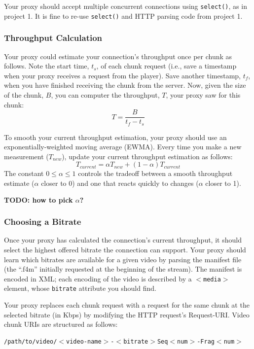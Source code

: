 \documentclass{article}
\begin{document}
Your proxy should accept multiple concurrent connections using
\texttt{select()}, as in project 1. It is fine to re-use \texttt{select()} and
HTTP parsing code from project 1.

\subsubsection{Throughput Calculation}
Your proxy could estimate your connection's throughput once per chunk as
follows. Note the start time, $t_s$, of each chunk request (i.e., save a
timestamp when your proxy receives a request from the player). Save another
timestamp, $t_f$, when you have finished receiving the chunk from the server.
Now, given the size of the chunk, $B$, you can computer the throughput, $T$,
your proxy saw for this chunk:
\[
	T = \frac{B}{t_f - t_s}
\]


To smooth your current throughput estimation, your proxy should use an
exponentially-weighted moving average (EWMA). Every time you make a new
measurement ($T_{new}$), update your current throughput estimation as follows:
\[
	T_{current} = \alpha T_{new}  +  (1 - \alpha)T_{current}
\]
The constant $0 \leq \alpha \leq 1$ controls the tradeoff between a smooth
throughput estimate ($\alpha$ closer to 0) and one that reacts quickly to
changes ($\alpha$ closer to 1).

\textbf{TODO: how to pick $\alpha$?}



\subsubsection{Choosing a Bitrate}

Once your proxy has calculated the connection's current throughput, it should
select the highest offered bitrate the connection can support. Your proxy
should learn which bitrates are available for a given video by parsing the
manifest file (the ``.f4m'' initially requested at the beginning of the
stream). The manifest is encoded in XML; each encoding of the video is
described by a \texttt{$<$media$>$} element, whose \texttt{bitrate} attribute
you should find.

Your proxy replaces each chunk request with a request for the same chunk at the
selected bitrate (in Kbps) by modifying the HTTP request's Request-URI. Video
chunk URIs are structured as follows:
\begin{center}
	\texttt{/path/to/video/$<$video-name$>$-$<$bitrate$>$Seq$<$num$>$-Frag$<$num$>$}
\end{center}
\end{document}
